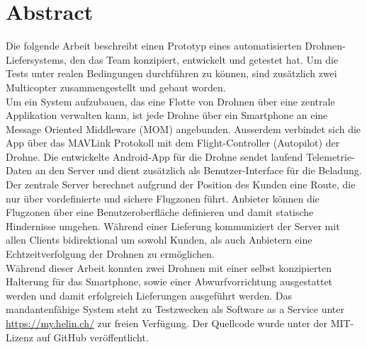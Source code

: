 \newpage
\cleardoublepage
{}
{}
\chapter*{Abstract}

Die folgende Arbeit beschreibt einen Prototyp eines automatisierten Drohnen-Liefersystems, den das Team konzipiert, entwickelt und getestet hat. Um die Tests unter realen Bedingungen durchführen zu können, sind zusätzlich zwei Multicopter zusammengestellt und gebaut worden.\\

Um ein System aufzubauen, das eine Flotte von Drohnen über eine zentrale Applikation verwalten kann, ist jede Drohne über ein Smartphone an eine Message Oriented Middleware (\Gls{MOM}) angebunden. Ausserdem verbindet sich die App über das \Gls{MAVLink} Protokoll mit dem \Gls{Flight-Controller} (Autopilot) der Drohne. 
Die entwickelte Android-App für die Drohne sendet laufend Telemetrie-Daten an den Server und dient zusätzlich als Benutzer-Interface für die Beladung. \\

Der zentrale Server berechnet aufgrund der Position des Kunden eine Route, die nur über vordefinierte und sichere Flugzonen führt. Anbieter können die Flugzonen über eine Benutzeroberfläche definieren und damit statische Hindernisse umgehen. Während einer Lieferung kommuniziert der Server mit allen Clients bidirektional um sowohl Kunden, als auch Anbietern eine Echtzeitverfolgung der Drohnen zu ermöglichen. \\

Während dieser Arbeit konnten zwei Drohnen mit einer selbst konzipierten Halterung für das Smartphone, sowie einer Abwurfvorrichtung ausgestattet werden und damit erfolgreich Lieferungen ausgeführt werden. Das mandantenfähige System steht zu Testzwecken als Software as a Service unter \url{https://my.helin.ch/} zur freien Verfügung. Der Quellcode wurde unter der MIT-Lizenz auf GitHub veröffentlicht.

